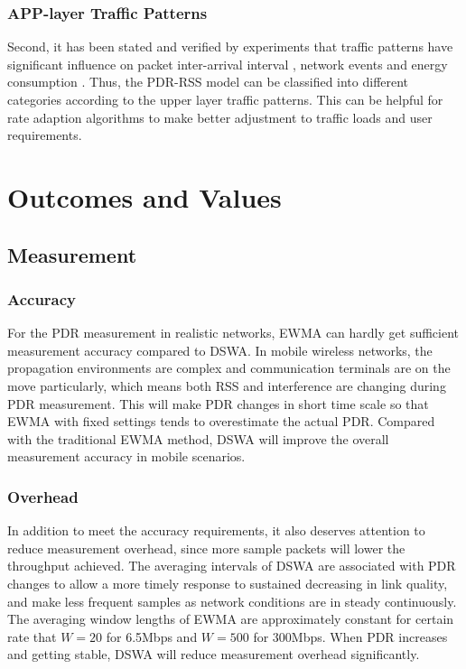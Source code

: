 \documentclass[draftclsnofoot,journal,onecolumn,11pt]{IEEEtran}
\begin{document}
\subsubsection{APP-layer Traffic Patterns}
Second, it has been stated and verified by experiments that traffic patterns have significant influence on packet inter-arrival interval \cite{Han:2012:DPW:2307636.2307675}, network events \cite{Wei:2012:PMP:2348543.2348563} and energy consumption \cite{Mittal:2012:EDE:2348543.2348583}. Thus, the PDR-RSS model can be classified into different categories according to the upper layer traffic patterns. This can be helpful for rate adaption algorithms to make better adjustment to traffic loads and user requirements.

\section{Outcomes and Values}

\subsection{Measurement}
\subsubsection{Accuracy}
For the PDR measurement in realistic networks, EWMA can hardly get sufficient measurement accuracy compared to DSWA. In mobile wireless networks, the propagation environments are complex and communication terminals are on the move particularly, which means both RSS and interference are changing during PDR measurement. This will make PDR changes in short time scale so that EWMA with fixed settings tends to overestimate the actual PDR. Compared with the traditional EWMA method, DSWA will improve the overall measurement accuracy in mobile scenarios.

\subsubsection{Overhead}
In addition to meet the accuracy requirements, it also deserves attention to reduce measurement overhead, since more sample packets will lower the throughput achieved. The averaging intervals of DSWA are associated with PDR changes to allow a more timely response to sustained decreasing in link quality, and make less frequent samples as network conditions are in steady continuously. The averaging window lengths of EWMA are approximately constant for certain rate that $W=20$ for 6.5Mbps and $W=500$ for 300Mbps. When PDR increases and getting stable, DSWA will reduce measurement overhead significantly.
\end{document}

